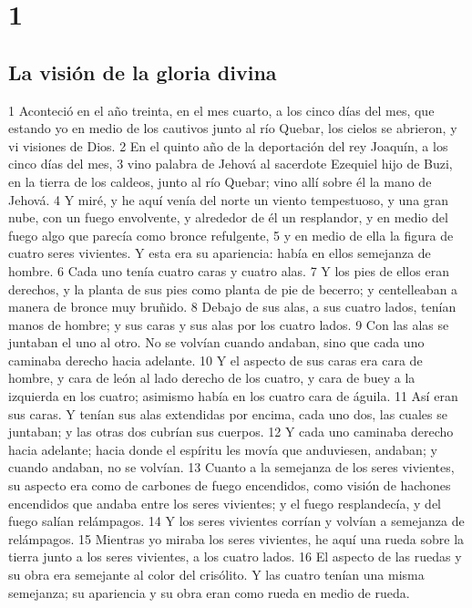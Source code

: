 
\chapter{1}

\section*{La visión de la gloria divina}

1 Aconteció en el año treinta, en el mes cuarto, a los cinco días del mes, que estando yo en medio de los cautivos junto al río Quebar, los cielos se abrieron, y vi visiones de Dios.
2 En el quinto año de la deportación del rey Joaquín, a los cinco días del mes,
3 vino palabra de Jehová al sacerdote Ezequiel hijo de Buzi, en la tierra de los caldeos, junto al río Quebar; vino allí sobre él la mano de Jehová.
4 Y miré, y he aquí venía del norte un viento tempestuoso, y una gran nube, con un fuego envolvente, y alrededor de él un resplandor, y en medio del fuego algo que parecía como bronce refulgente,
5 y en medio de ella la figura de cuatro seres vivientes. Y esta era su apariencia: había en ellos semejanza de hombre.
6 Cada uno tenía cuatro caras y cuatro alas.
7 Y los pies de ellos eran derechos, y la planta de sus pies como planta de pie de becerro; y centelleaban a manera de bronce muy bruñido.
8 Debajo de sus alas, a sus cuatro lados, tenían manos de hombre; y sus caras y sus alas por los cuatro lados.
9 Con las alas se juntaban el uno al otro. No se volvían cuando andaban, sino que cada uno caminaba derecho hacia adelante.
10 Y el aspecto de sus caras era cara de hombre, y cara de león al lado derecho de los cuatro, y cara de buey a la izquierda en los cuatro; asimismo había en los cuatro cara de águila. 
11 Así eran sus caras. Y tenían sus alas extendidas por encima, cada uno dos, las cuales se juntaban; y las otras dos cubrían sus cuerpos.
12 Y cada uno caminaba derecho hacia adelante; hacia donde el espíritu les movía que anduviesen, andaban; y cuando andaban, no se volvían.
13 Cuanto a la semejanza de los seres vivientes, su aspecto era como de carbones de fuego encendidos, como visión de hachones encendidos que andaba entre los seres vivientes; y el fuego resplandecía, y del fuego salían relámpagos.
14 Y los seres vivientes corrían y volvían a semejanza de relámpagos.
15 Mientras yo miraba los seres vivientes, he aquí una rueda sobre la tierra junto a los seres vivientes, a los cuatro lados.
16 El aspecto de las ruedas y su obra era semejante al color del crisólito. Y las cuatro tenían una misma semejanza; su apariencia y su obra eran como rueda en medio de rueda.
